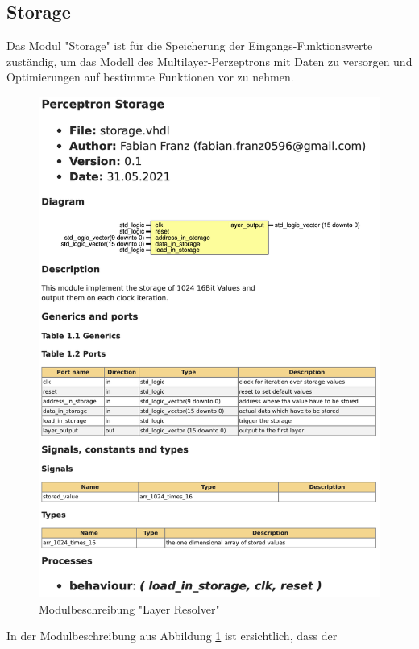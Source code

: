 \documentclass{article}
\numberwithin{equation}{section}
\begin{document}
\subsection{Storage}
Das Modul "Storage" ist für die Speicherung der Eingangs-Funktionswerte zuständig, um das 
Modell des Multilayer-Perzeptrons mit Daten zu versorgen und Optimierungen auf bestimmte 
Funktionen vor zu nehmen.
\begin{figure}[htb!]
    \begin{center}
      \includegraphics[width=13.25cm]{ModuleDescription/storage.png}
    \end{center}
    \caption{Modulbeschreibung "Layer Resolver"} \label{fig:storage}
  \end{figure}
\FloatBarrier
\pagebreak
In der Modulbeschreibung aus Abbildung \ref{fig:storage} ist ersichtlich, dass der 
\end{document}
